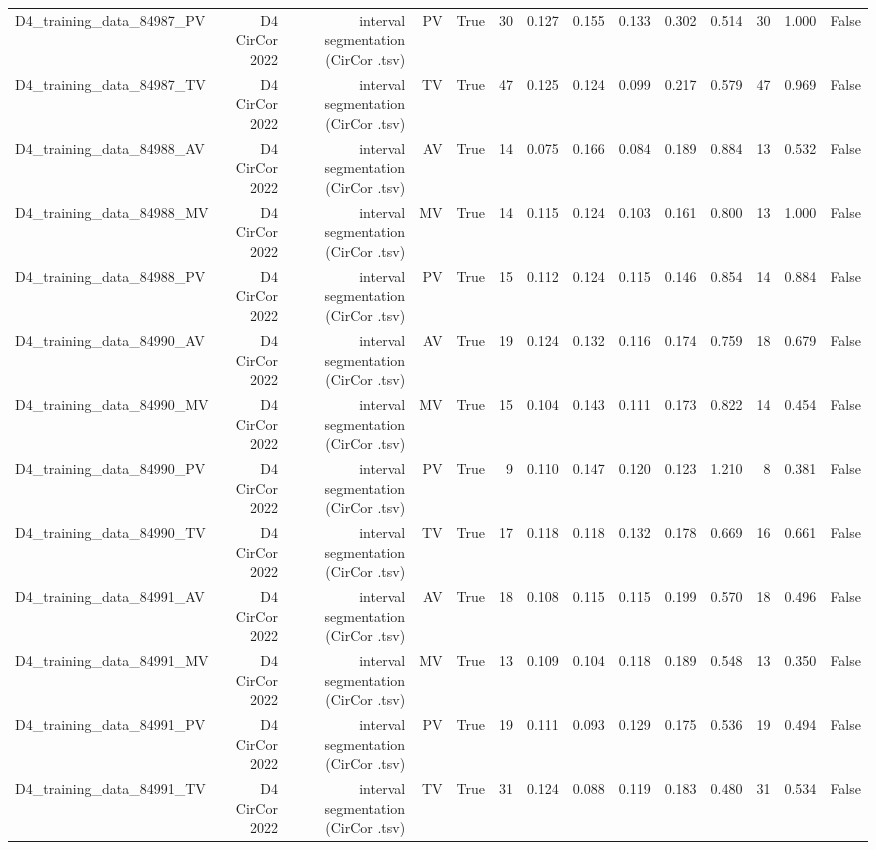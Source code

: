 \begin{table}[htbp]
\begin{tabular}{lrrrrrrrrrrrrr}
    D4\_training\_data\_84987\_PV & D4 CirCor 2022 & interval segmentation (CirCor .tsv) & PV & True & 30 & 0.127 & 0.155 & 0.133 & 0.302 & 0.514 & 30 & 1.000 & False \\
    D4\_training\_data\_84987\_TV & D4 CirCor 2022 & interval segmentation (CirCor .tsv) & TV & True & 47 & 0.125 & 0.124 & 0.099 & 0.217 & 0.579 & 47 & 0.969 & False \\
    D4\_training\_data\_84988\_AV & D4 CirCor 2022 & interval segmentation (CirCor .tsv) & AV & True & 14 & 0.075 & 0.166 & 0.084 & 0.189 & 0.884 & 13 & 0.532 & False \\
    D4\_training\_data\_84988\_MV & D4 CirCor 2022 & interval segmentation (CirCor .tsv) & MV & True & 14 & 0.115 & 0.124 & 0.103 & 0.161 & 0.800 & 13 & 1.000 & False \\
    D4\_training\_data\_84988\_PV & D4 CirCor 2022 & interval segmentation (CirCor .tsv) & PV & True & 15 & 0.112 & 0.124 & 0.115 & 0.146 & 0.854 & 14 & 0.884 & False \\
    D4\_training\_data\_84990\_AV & D4 CirCor 2022 & interval segmentation (CirCor .tsv) & AV & True & 19 & 0.124 & 0.132 & 0.116 & 0.174 & 0.759 & 18 & 0.679 & False \\
    D4\_training\_data\_84990\_MV & D4 CirCor 2022 & interval segmentation (CirCor .tsv) & MV & True & 15 & 0.104 & 0.143 & 0.111 & 0.173 & 0.822 & 14 & 0.454 & False \\
    D4\_training\_data\_84990\_PV & D4 CirCor 2022 & interval segmentation (CirCor .tsv) & PV & True & 9 & 0.110 & 0.147 & 0.120 & 0.123 & 1.210 & 8 & 0.381 & False \\
    D4\_training\_data\_84990\_TV & D4 CirCor 2022 & interval segmentation (CirCor .tsv) & TV & True & 17 & 0.118 & 0.118 & 0.132 & 0.178 & 0.669 & 16 & 0.661 & False \\
    D4\_training\_data\_84991\_AV & D4 CirCor 2022 & interval segmentation (CirCor .tsv) & AV & True & 18 & 0.108 & 0.115 & 0.115 & 0.199 & 0.570 & 18 & 0.496 & False \\
    D4\_training\_data\_84991\_MV & D4 CirCor 2022 & interval segmentation (CirCor .tsv) & MV & True & 13 & 0.109 & 0.104 & 0.118 & 0.189 & 0.548 & 13 & 0.350 & False \\
    D4\_training\_data\_84991\_PV & D4 CirCor 2022 & interval segmentation (CirCor .tsv) & PV & True & 19 & 0.111 & 0.093 & 0.129 & 0.175 & 0.536 & 19 & 0.494 & False \\
    D4\_training\_data\_84991\_TV & D4 CirCor 2022 & interval segmentation (CirCor .tsv) & TV & True & 31 & 0.124 & 0.088 & 0.119 & 0.183 & 0.480 & 31 & 0.534 & False \\

\end{tabular}
\end{table}
